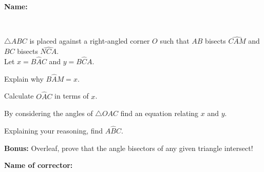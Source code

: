 \documentclass[8pt]{exam}
\begin{document}
\textbf{Name:} \dotfill

\

$\triangle ABC$ is placed against a right-angled corner $O$ such that $AB$ bisects $\widehat{CAM}$ and $BC$ bisects $\widehat{NCA}$. \\
Let $x = B\hat{A}C$ and $y= B\hat{C}A$.

\begin{center}
\end{center}

\begin{questions}


\question[1] Explain why $B\hat{A}M = x $.
\fillwithdottedlines{7mm}

\question[2] Calculate $O\hat{A}C$ in terms of $x$.
\fillwithdottedlines{7mm}

\question[3] By considering the angles of $\triangle OAC$ find an equation relating $x$ and $y$.
\fillwithdottedlines{28mm}

\question[2] Explaining your reasoning, find $A\hat{B}C$.
\fillwithdottedlines{63mm}


\end{questions}

\textbf{Bonus:} Overleaf, prove that the angle bisectors of any given triangle intersect!

\vfill 

\begin{tcolorbox}

\textbf{Name of corrector:}

\begin{center}
\gradetable[h][questions]
\end{center}

\end{tcolorbox}
\end{document}
